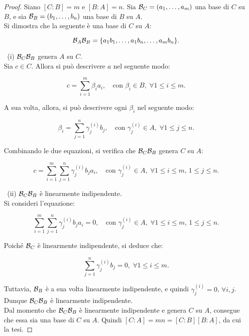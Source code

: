 \begin{proof}
    Siano $[C : B] = m$ e $[B : A] = n$. Sia
    $\mathcal{B}_C = (a_1, \ldots, a_m)$ una base
    di $C$ su $B$, e sia $\mathcal{B}_B = (b_1, \ldots, b_n)$ una
    base di $B$ su $A$. \\

    Si dimostra che la seguente è una base di $C$ su $A$:

    \[\mathcal{B}_A \mathcal{B}_B = \{ a_1b_1, \ldots, a_1b_n, \ldots, a_mb_n\}. \]

    \vskip 0.1in

    \ (i) $\mathcal{B}_C \mathcal{B}_B$ genera $A$ su $C$. \\

    Sia $c \in C$. Allora si può descrivere $a$ nel seguente
    modo:

    \[c = \sum_{i=1}^m \beta_i a_i, \quad \text{con } \beta_i \in B, \; \forall 1 \leq i \leq m.\]

    A sua volta, allora, si può descrivere ogni $\beta_i$ nel
    seguente modo:

    \[\beta_i = \sum_{j=1}^n \gamma_j^{(i)} b_j, \quad \text{con }
        \gamma_j^{(i)} \in A, \; \forall 1 \leq j \leq n.\]

    \vskip 0.1in

    Combinando le due equazioni, si verifica che $\mathcal{B}_C \mathcal{B}_B$ genera $C$ su $A$:

    \[ c = \sum_{i=1}^m \sum_{j=1}^n \gamma_j^{(i)} b_j a_i, \quad \text{con } \gamma_j^{(i)} \in A, \; \forall 1 \leq i \leq m, \, 1 \leq j \leq n. \]

    \vskip 0.1in

    \ (ii) $\mathcal{B}_C \mathcal{B}_B$ è linearmente indipendente. \\

    Si consideri l'equazione:

    \[ \sum_{i=1}^m \sum_{j=1}^n \gamma_j^{(i)} b_j a_i = 0, \quad \text{con } \gamma_j^{(i)} \in A, \; \forall 1 \leq i \leq m, \, 1 \leq j \leq n .\]

    Poiché $\mathcal{B}_C$ è linearmente indipendente, si deduce
    che:

    \[ \sum_{j=1}^n \gamma_j^{(i)} b_j = 0, \; \forall 1 \leq i \leq m. \]

    Tuttavia, $\mathcal{B}_B$ è a sua volta linearmente indipendente,
    e quindi $\gamma_j^{(i)} = 0$, $\forall i, j$. Dunque
    $\mathcal{B}_C \mathcal{B}_B$ è linearmente indipendente. \\

    Dal momento che $\mathcal{B}_C \mathcal{B}_B$ è linearmente indipendente e
    genera $C$ su $A$, consegue che essa sia una base di $C$ su
    $A$. Quindi $[C : A] = mn = [C : B][B : A]$, da cui la tesi.
\end{proof}

